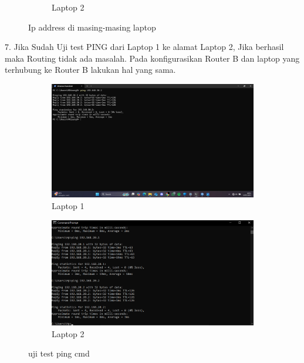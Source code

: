\begin{figure}[H]
\begin{subfigure}[b]{0.3\linewidth}
      \caption{Laptop 2}
    \end{subfigure}
    \caption{Ip address di masing-masing laptop}
\end{figure}

7. Jika Sudah Uji test PING dari Laptop 1 ke alamat Laptop 2, Jika berhasil maka Routing tidak ada masalah. Pada konfigurasikan Router B dan laptop yang terhubung ke Router B lakukan hal yang sama.
\begin{figure}[H]
    \centering
    \begin{subfigure}[b]{0.3\linewidth}
      \centering
      \includegraphics[width=\linewidth]{image/station4.jpg}
      \caption{Laptop 1}
    \end{subfigure}
    \hspace{1cm}
    \begin{subfigure}[b]{0.3\linewidth}
      \centering
      \includegraphics[width=\linewidth]{image/bridge9.png}
      \caption{Laptop 2}
    \end{subfigure}
    \caption{uji test ping cmd}
\end{figure}

